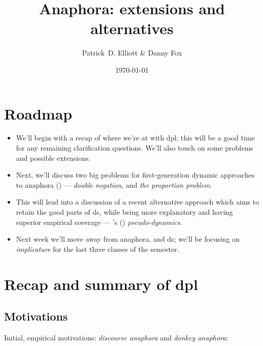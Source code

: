 \documentclass[nols,twoside,nofonts,nobib,nohyper]{tufte-handout}
\title{Anaphora: extensions and alternatives}
\date{\today}
\author[Patrick D. Elliott \& Danny Fox]{Patrick~D. Elliott \& Danny Fox}
\theoremstyle{observation}
\theoremstyle{theorem}
\theoremstyle{corollary}
\theoremstyle{definition}
\begin{document}
\maketitle%

\section{Roadmap}

\begin{itemize}

        \item We'll begin with a recap of where we're at with \ac{dpl}; this will be a good time for any remaining clarification questions. We'll also touch on some problems and possible extensions.

        \item Next, we'll discuss two big problems for first-generation dynamic approaches to anaphora (\citealt{Heim1982,Kamp1981,GroenendijkStokhof1991}) --- \textit{double negation}, and \textit{the proportion problem}.

        \item This will lead into a discussion of a recent alternative approach which aims to retain the good parts of \ac{ds}, while being more explanatory and having superior empirical coverage --- \citeauthor{Mandelkern2020a}'s (\citeyear{Mandelkern2020a,Mandelkern2020b}) \textit{pseudo-dynamics}.

        \item Next week we'll move away from anaphora, and \ac{ds}; we'll be focusing on \textit{implicature} for the last three classes of the semester.

\end{itemize}

\section{Recap and summary of \ac{dpl}}

\subsection{Motivations}

Initial, empirical motivations: \textit{discourse anaphora} and \textit{donkey anaphora}:
\end{document}
